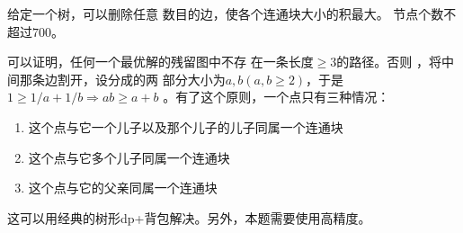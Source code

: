 \begin{prob}
	给定一个树，可以删除任意
	数目的边，使各个连通块大小的积最大。
	节点个数不超过$700$。
\end{prob}

\begin{sol}
	可以证明，任何一个最优解的残留图中不存
	在一条长度$ \ge 3$的路径。否则
	，将中间那条边割开，设分成的两
	部分大小为$a,b(a,b \ge 2)$，于是
	$1 \ge 1/a+1/b \Rightarrow ab \ge a+b$
	。有了这个原则，一个点只有三种情况：
	\begin{enumerate}
		\item 这个点与它一个儿子以及那个儿子的儿子同属一个连通块
		\item 这个点与它多个儿子同属一个连通块
		\item 这个点与它的父亲同属一个连通块
	\end{enumerate}
	\par
	这可以用经典的树形dp+背包解决。另外，本题需要使用高精度。
\end{sol}
